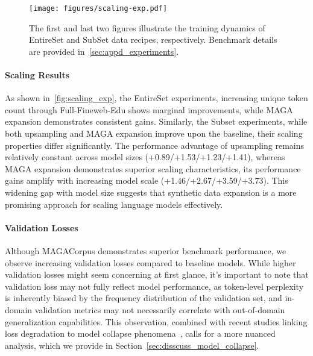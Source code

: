 \begin{figure}[h]
  \centering
  \texttt{[image: figures/scaling-exp.pdf]}
  \vspace{-2em}
  \caption{The first and last two figures illustrate the training dynamics of EntireSet and SubSet data recipes, respectively.
  Benchmark details are provided in~\autoref{sec:appd_experiments}.}
  \label{fig:scaling_exp}
\end{figure}

\paragraph{Scaling Results}
As shown in~\autoref{fig:scaling_exp}, the EntireSet experiments, increasing unique token count through Full-Fineweb-Edu shows marginal improvements,
while MAGA expansion demonstrates consistent gains.
Similarly, the Subset experiments, while both upsampling and MAGA expansion improve upon the baseline,
their scaling properties differ significantly.
The performance advantage of upsampling remains relatively constant across model sizes (+0.89/+1.53/+1.23/+1.41),
whereas MAGA expansion demonstrates superior scaling characteristics, its performance gains amplify with increasing model scale (+1.46/+2.67/+3.59/+3.73).
This widening gap with model size suggests that synthetic data expansion is a more promising approach for scaling language models effectively.


\paragraph{Validation Losses}
Although MAGACorpus demonstrates superior benchmark performance, we observe increasing validation losses compared to baseline models.
While higher validation losses might seem concerning at first glance, it's important to note that validation loss may not fully reflect model performance,
as token-level perplexity is inherently biased by the frequency distribution of the validation set, and in-domain validation metrics may not necessarily correlate with out-of-domain generalization capabilities.
This observation, combined with recent studies linking loss degradation to model collapse phenomena~\citep{dohmatob2024talecollapse,dohmatob2024strongcollapse,zhu2024synthesize}, calls for a more nuanced analysis, which we provide in Section~\ref{sec:disscuss_model_collapse}.




